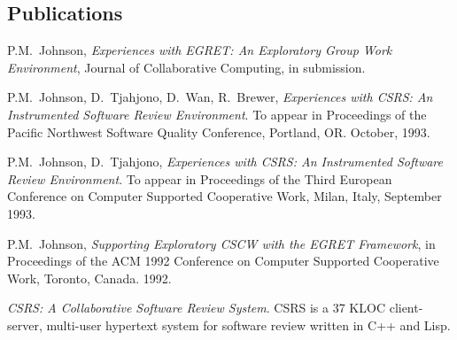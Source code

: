 \subsection*{Publications}

\begin{Five Closely Related Publications and Systems}

\item P.M.~Johnson, {\sl Experiences with EGRET: An Exploratory Group Work Environment},
Journal of Collaborative Computing, in submission.

\item P.M.~Johnson, D.~Tjahjono, D.~Wan, R.~Brewer, {\sl Experiences with CSRS: An Instrumented Software Review Environment}.
To appear in Proceedings of the Pacific Northwest Software Quality Conference, Portland, OR. October, 1993.

\item P.M.~Johnson, D.~Tjahjono, {\sl Experiences with CSRS: An Instrumented Software Review Environment}.
To appear in Proceedings of the Third European Conference on Computer Supported Cooperative
Work, Milan, Italy, September 1993.

\item P.M.~Johnson, {\sl Supporting Exploratory CSCW with the EGRET Framework},
in Proceedings of the ACM 1992 Conference on Computer Supported Cooperative
Work, Toronto, Canada. 1992.

\item {\em CSRS: A Collaborative Software Review System}.  CSRS is a 37 KLOC client-server, 
multi-user hypertext system for software review written in C++ and Lisp.  

\end{Five Closely Related Publications and Systems}

